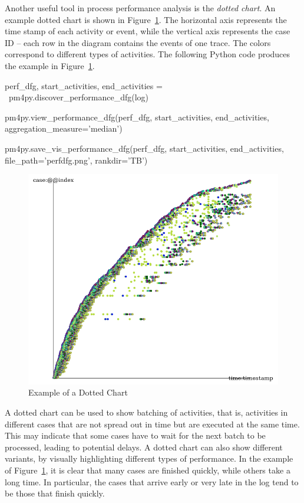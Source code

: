 Another useful tool in process performance analysis is the \emph{dotted chart}. An example dotted chart is shown in Figure~\ref{fig:dotted_chart}. The horizontal axis represents the time stamp of each activity or event, while the vertical axis represents the case ID -- each row in the diagram contains the events of one trace. The colors correspond to different types of activities. The following Python code produces the example in Figure~\ref{fig:dotted_chart}.

\begin{samepage}
\begin{pythoncode}
perf_dfg, start_activities, end_activities = \
    pm4py.discover_performance_dfg(log)
    
pm4py.view_performance_dfg(perf_dfg, 
    start_activities, end_activities, 
    aggregation_measure='median')
    
pm4py.save_vis_performance_dfg(perf_dfg, 
    start_activities, end_activities, 
    file_path='perfdfg.png', rankdir='TB')
\end{pythoncode}
\end{samepage}

\begin{figure}
\centering
\includegraphics[width=.8\textwidth]{dottedchart.png}
\caption{Example of a Dotted Chart}
\label{fig:dotted_chart}
\end{figure}

A dotted chart can be used to show batching of activities, that is, activities in different cases that are not spread out in time but are executed at the same time. This may indicate that some cases have to wait for the next batch to be processed, leading to potential delays. A dotted chart can also show different variants, by visually highlighting different types of performance. In the example of Figure~\ref{fig:dotted_chart}, it is clear that many cases are finished quickly, while others take a long time. In particular, the cases that arrive early or very late in the log tend to be those that finish quickly. 

